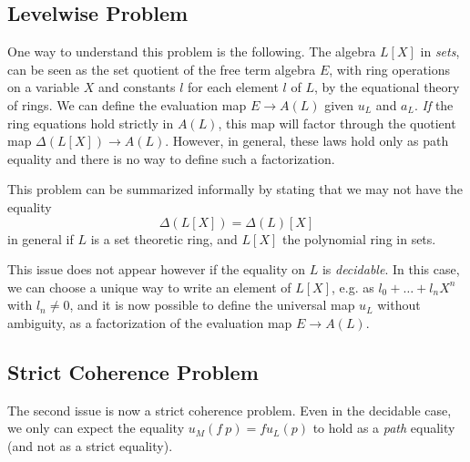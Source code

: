 \documentclass[10pt,a4paper]{article}
\theoremstyle{definition}
\theoremstyle{remark}
\begin{document}
\subsection{Levelwise Problem}


One way to understand this problem is the following. The algebra $L[X]$ in {\em sets}, can be seen as the set quotient
of the free term algebra $E$, with ring operations on a variable $X$ and constants $l$ for each element $l$ of $L$, by the
equational theory of rings. We
can define the evaluation map $E\rightarrow A(L)$ given $u_L$ and $a_L$. {\em If} the ring equations hold strictly in $A(L)$,
this map will factor through the quotient map $\Delta(L[X])\rightarrow A(L)$. However, in general, these laws hold only
as path equality and there is no way to define such a factorization.

This problem can be  summarized informally by stating that we may not have the equality
\[
\Delta(L[X]) = \Delta(L)[X]
\]
in general if $L$ is a set theoretic ring, and $L[X]$ the polynomial ring in sets.

This issue does not appear however if the equality on $L$ is {\em decidable}. In this case, we can choose a unique way to write an element of
$L[X]$, e.g. as $l_0+\dots + l_nX^n$ with $l_n\neq 0$, and it is now possible to define the universal map $u_L$ without ambiguity, as 
a factorization of the evaluation map $E\rightarrow A(L)$.

\subsection{Strict Coherence Problem}


The second issue is now a strict coherence problem. Even in the decidable case,
we only can expect the equality $u_M(f~p) = f u_L(p)$ to hold as a {\em path} equality (and not as
a strict equality).

\end{document}
